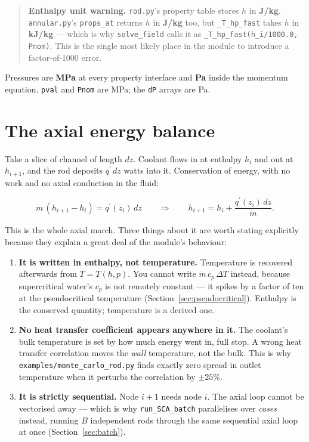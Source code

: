 \documentclass[11pt]{article}
\newcommand{\code}[1]{\texttt{#1}}
\newcommand{\qp}{q^{\prime}}
\begin{document}
\begin{quote}
\textbf{Enthalpy unit warning.} \code{rod.py}'s property table stores $h$ in
\textbf{J/kg}. \code{annular.py}'s \code{props\_at} returns $h$ in \textbf{J/kg} too,
but \code{\_T\_hp\_fast} takes $h$ in \textbf{kJ/kg} --- which is why
\code{solve\_field} calls it as \code{\_T\_hp\_fast(h\_i/1000.0, Pnom)}. This is the
single most likely place in the module to introduce a factor-of-1000 error.
\end{quote}

Pressures are \textbf{MPa} at every property interface and \textbf{Pa} inside the
momentum equation. \code{pval} and \code{Pnom} are MPa; the \code{dP} arrays are Pa.

\section{The axial energy balance}
\label{sec:axial}

Take a slice of channel of length $dz$. Coolant flows in at enthalpy $h_i$ and out at
$h_{i+1}$, and the rod deposits $\qp\,dz$ watts into it. Conservation of energy, with no
work and no axial conduction in the fluid:

\begin{equation}
\dot m \, (h_{i+1} - h_i) = \qp(z_i)\, dz
\qquad\Longrightarrow\qquad
h_{i+1} = h_i + \frac{\qp(z_i)\,dz}{\dot m}.
\label{eq:march}
\end{equation}

This is the whole axial march. Three things about it are worth stating explicitly
because they explain a great deal of the module's behaviour:

\begin{enumerate}
\item \textbf{It is written in enthalpy, not temperature.} Temperature is recovered
      afterwards from $T = T(h,p)$. You cannot write $\dot m\,c_p\,\Delta T$ instead,
      because supercritical water's $c_p$ is not remotely constant --- it spikes by a
      factor of ten at the pseudocritical temperature (Section~\ref{sec:pseudocritical}).
      Enthalpy is the conserved quantity; temperature is a derived one.
\item \textbf{No heat transfer coefficient appears anywhere in it.} The coolant's bulk
      temperature is set by how much energy went in, full stop. A wrong heat transfer
      correlation moves the \emph{wall} temperature, not the bulk. This is why
      \code{examples/monte\_carlo\_rod.py} finds exactly zero spread in outlet
      temperature when it perturbs the correlation by $\pm25\%$.
\item \textbf{It is strictly sequential.} Node $i+1$ needs node $i$. The axial loop
      cannot be vectorised away --- which is why \code{run\_SCA\_batch} parallelises
      over \emph{cases} instead, running $B$ independent rods through the same
      sequential axial loop at once (Section~\ref{sec:batch}).
\end{enumerate}
\end{document}
